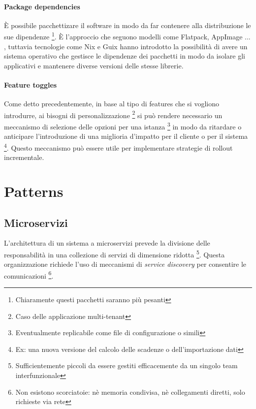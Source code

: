\documentclass[a4paper,11pt,oneside, table]{article}
\begin{document}
  \paragraph{Package dependencies}

  \`E possibile pacchettizare il software in modo da far contenere alla distribuzione le sue dipendenze \footnote{Chiaramente questi pacchetti saranno pi\`u pesanti}. \`E l'approccio che seguono modelli come Flatpack, AppImage ... \cite{cichocki2023comparative}, tuttavia tecnologie come Nix \cite{dolstra2004nix} e Guix \cite{courtes2013functional} hanno introdotto la possibilit\`a di avere un sistema operativo che gestisce le dipendenze dei pacchetti in modo da isolare gli applicativi e mantenere diverse versioni delle stesse librerie.

  \paragraph{Feature toggles}

  Come detto precedentemente, in base al tipo di features che si vogliono introdurre, ai bisogni di personalizzazione \footnote{Caso delle applicazione multi-tenant} si pu\`o rendere necessario un meccanismo di selezione delle opzioni per una istanza \footnote{Eventualmente replicabile come file di configurazione o simili} in modo da ritardare o anticipare l'introduzione di una miglioria d'impatto per il cliente o per il sistema \footnote{Ex: una nuova versione del calcolo delle scadenze o dell'importazione dati}. Questo meccanismo pu\`o essere utile per implementare strategie di rollout incrementale.

  \section{Patterns}

  \subsection{Microservizi}

  L'architettura di un sistema a microservizi prevede la divisione delle responsabilit\`a in una collezione di servizi di dimensione ridotta \footnote{Sufficientemente piccoli da essere gestiti efficacemente da un singolo team interfunzionale}. Questa organizzazione richiede l'uso di meccanismi di \textit{service discovery} per consentire le comunicazioni \footnote{Non esistono scorciatoie: n\`e memoria condivisa, n\`e collegamenti diretti, solo richieste via rete}.
\end{document}
